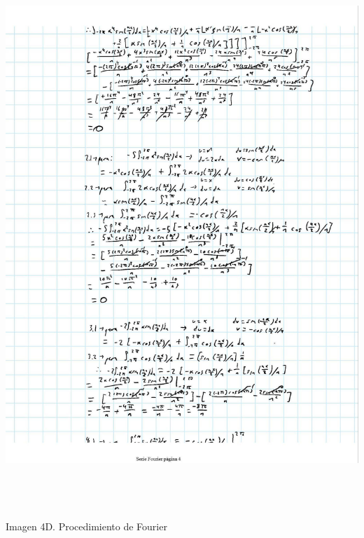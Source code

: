 \includegraphics[width=6.26772in,height=8.11111in]{media/image57.jpg}

Imagen 4D. Procedimiento de Fourier

